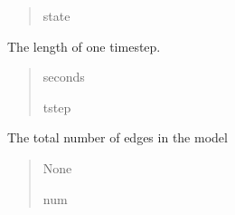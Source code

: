 \documentclass[letterpaper,10pt,english]{sphinxmanual}
\begin{document}
\begin{fulllineitems}
\begin{fulllineitems}
\begin{quote}
\begin{description}
\sphinxAtStartPar
state

\end{description}\end{quote}

\end{fulllineitems}


\begin{fulllineitems}
\label{\detokenize{lysis.util:lysis.util.parameters.MacroParameters.time_step}}
\pysigstartsignatures
{}
\pysigstopsignatures
\sphinxAtStartPar
The length of one timestep.
\begin{quote}\begin{description}
\sphinxAtStartPar
seconds

\sphinxAtStartPar
tstep

\end{description}\end{quote}

\end{fulllineitems}


\begin{fulllineitems}
\label{\detokenize{lysis.util:lysis.util.parameters.MacroParameters.total_edges}}
\pysigstartsignatures
{}
\pysigstopsignatures
\sphinxAtStartPar
The total number of edges in the model
\begin{quote}\begin{description}
\sphinxAtStartPar
None

\sphinxAtStartPar
num

\end{description}\end{quote}

\end{fulllineitems}



\end{fulllineitems}
\end{document}
